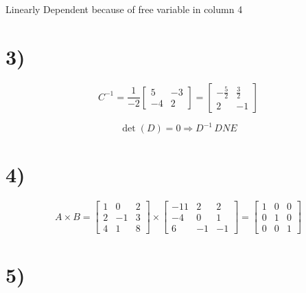 \documentclass{article}
\begin{document}
Linearly Dependent because of free variable in column 4

\section*{3)}

\[
	C^{-1}=
	\frac{1}{-2}
	\begin{bmatrix}
		5  & -3 \\
		-4 & 2
	\end{bmatrix}
	=
	\begin{bmatrix}
		-\frac{5}{2} & \frac{3}{2} \\
		2            & -1
	\end{bmatrix}
\]

\[
	\det(D) = 0 \Longrightarrow  D^{-1} \, DNE
\]

\section*{4)}

\[
	A \times B =
	\begin{bmatrix}
		1 & 0  & 2 \\
		2 & -1 & 3 \\
		4 & 1  & 8
	\end{bmatrix}
	\times
	\begin{bmatrix}
		-11 & 2  & 2  \\
		-4  & 0  & 1  \\
		6   & -1 & -1
	\end{bmatrix}
	=
	\begin{bmatrix}
		1 & 0 & 0 \\
		0 & 1 & 0 \\
		0 & 0 & 1
	\end{bmatrix}
\]

\section*{5)}
\end{document}
